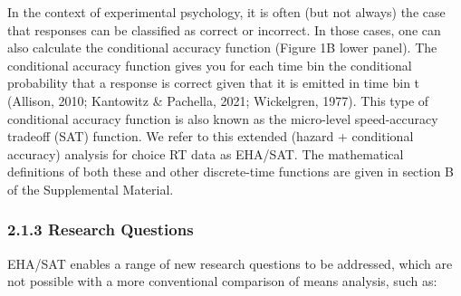 \documentclass[
  english,
  man, donotrepeattitle,floatsintext]{apa6}
\begin{document}
In the context of experimental psychology, it is often (but not always) the case that responses can be classified as correct or incorrect.
In those cases, one can also calculate the conditional accuracy function (Figure 1B lower panel).
The conditional accuracy function gives you for each time bin the conditional probability that a response is correct given that it is emitted in time bin t (Allison, 2010; Kantowitz \& Pachella, 2021; Wickelgren, 1977). This type of conditional accuracy function is also known as the micro-level speed-accuracy tradeoff (SAT) function. We refer to this extended (hazard + conditional accuracy) analysis for choice RT data as EHA/SAT. The mathematical definitions of both these and other discrete-time functions are given in section B of the Supplemental Material.

\subsubsection{2.1.3 Research Questions}\label{research-questions}

EHA/SAT enables a range of new research questions to be addressed, which are not possible with a more conventional comparison of means analysis, such as:
\end{document}

